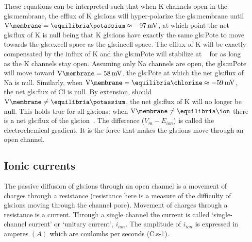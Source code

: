 \documentclass[../../Orator]{subfiles}
\begin{document}
These equations can be interpreted such that when
\gls{K} channels open in the \gls{gls:membrane}, the efflux of \gls{K} \glspl{gls:ion} will hyper-polarize the \gls{gls:membrane} until \(\unit{\V\membrane} = \unit{\equilibria\potassium} \approx \qty{-97}{\mV}\), at which point the net \gls{gls:flux} of \gls{K} is null being that \gls{K} \glspl{gls:ion} have exactly the same \gls{gls:Pote} to move towards the \gls{gls:excell} space as the \gls{gls:incell} space. 
The efflux of \gls{K} will be exactly compensated by the influx of \gls{K} and the \gls{gls:mPote} will stabilize at \unit{\equilibria\potassium} for as long as the \gls{K} channels stay open. 
Assuming only \gls{Na} channels are open, the \gls{gls:mPote} will move toward \(\unit{\V\membrane} = \qty{58}{\mV}\), the \gls{gls:Pote} at which the net \gls{gls:flux} of \gls{Na} is null. 
Similarly, when \(\unit{\V\membrane} = \unit{\equilibria\chlorine} \approx \qty{-59}{\mV}\),  
the net \gls{gls:flux} of \gls{Cl} is null. 
By extension, should \(\unit{\V\membrane} \neq \unit{\equilibria\potassium}\), the net \gls{gls:flux} of  \gls{K} will no longer be null. 
This holds true for all \glspl{gls:ion}: when \(\unit{\V\membrane} \neq \unit{\equilibria\ion}\) there is a net \gls{gls:flux} of the \gls{gls:ion}~\cite{}. The difference (\(V_m-E_{ion}\)) is called the electrochemical gradient. It is the force that makes the \glspl{gls:ion} move through an open channel.

\endgroup

\subsection{Ionic currents}
The passive diffusion of \glspl{gls:ion} through an open channel is a movement of charges through a resistance (resistance here is a measure of the difficulty of \glspl{gls:ion} moving through the channel pore). Movement of charges through a resistance is a current. Through a single channel the current is called ‘single-channel current’ or ‘unitary current’, \(i_{ion}\). The amplitude of  \(i_{ion}\) is expressed in amperes \((A)\) which are coulombs per seconds (C.s-1). 
\end{document}
